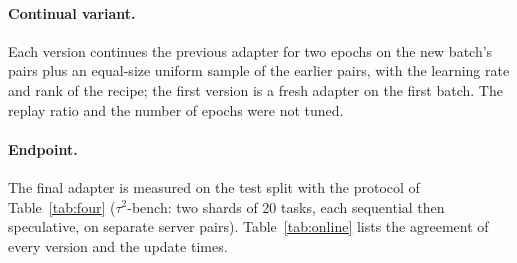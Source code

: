 \paragraph{Continual variant.} Each version continues the previous adapter for two epochs on the new batch's
pairs plus an equal-size uniform sample of the earlier pairs, with the learning rate and rank of the recipe;
the first version is a fresh adapter on the first batch. The replay ratio and the number of epochs were not
tuned.



\paragraph{Endpoint.} The final adapter is measured on the test split with the protocol of
Table~\ref{tab:four} ($\tau^2$-bench: two shards of 20 tasks, each sequential then speculative, on separate server
pairs). Table~\ref{tab:online} lists the agreement of every version and the update times.

\begin{table}[h]
\centering
\caption{\textbf{Online training: agreement of each adapter version} (offline exact match on the held-out
contexts, \%). OpenAGI: 263 test contexts, one version per 25 training tasks; $\tau^2$-bench: 226 validation
contexts, one version per 10 tasks, so its 60 training tasks give six versions. Offline drafts: 75.0 (OpenAGI) and 63.7 ($\tau^2$-bench). Update time is the
time from the end of a batch to the loaded adapter (buffer build and training).}
\label{tab:online}
\small
{}
\end{table}


